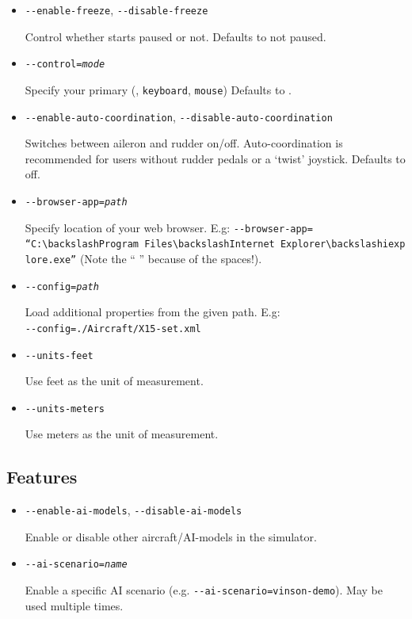\begin{itemize}
\item{\texttt{-$ $-enable-freeze}, \texttt{-$ $-disable-freeze}}

  Control whether \FlightGear{} starts paused or not. Defaults to not paused.

\item{\texttt{-$ $-control={\it mode}}}

  Specify your primary  (,  \texttt{keyboard},
  \texttt{mouse}) Defaults to .

\item{\texttt{-$ $-enable-auto-coordination}, \texttt{-$ $-disable-auto-coordination}}

  Switches  between aileron and rudder on/off. Auto-coordination
  is recommended for users without rudder pedals or a `twist' joystick. Defaults to off.

\item{\texttt{-$ $-browser-app={\it path}}}

  Specify location of your web browser. E.g:
  \texttt{-$ $-browser-app=}\\
  \texttt{``C:$\backslash$Program~Files$\backslash$Internet~Explorer$\backslash$iexplore.exe''}
  (Note the `` '' because of the spaces!).

\item{\texttt{-$ $-config={\it path}}}

  Load additional properties from the given path. E.g:\\
  \texttt{-$ $-config=./Aircraft/X15-set.xml}

\item{\texttt{-$ $-units-feet}}

  Use feet as the unit of measurement.

\item{\texttt{-$ $-units-meters}}

  Use meters as the unit of measurement.

    
\end{itemize}

\subsection{Features}
\begin{itemize}

\item{\texttt{-$ $-enable-ai-models}, \texttt{-$ $-disable-ai-models}}

  Enable or disable other aircraft/AI-models in the simulator.

\item{\texttt{-$ $-ai-scenario={\it name}}}

  Enable a specific AI scenario (e.g. \texttt{-$ $-ai-scenario=vinson-demo}). May be used multiple times.

\end{itemize}

